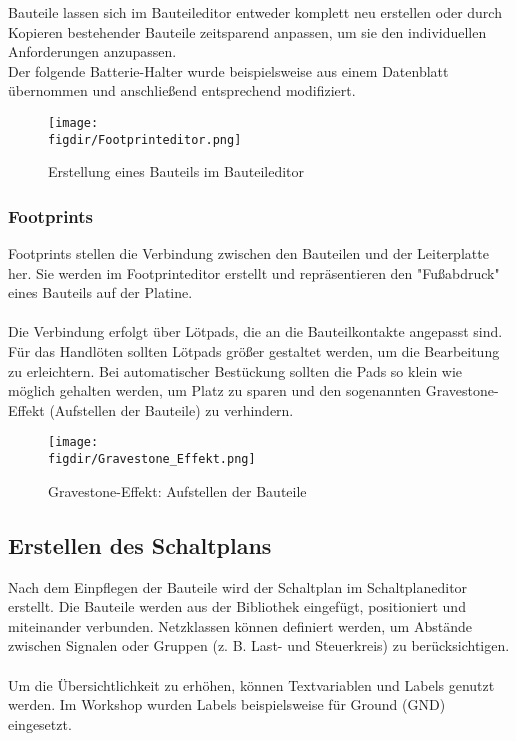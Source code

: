 \noindent
Bauteile lassen sich im Bauteileditor entweder komplett neu erstellen oder durch Kopieren bestehender Bauteile zeitsparend anpassen, um sie den individuellen Anforderungen anzupassen.\\
Der folgende Batterie-Halter wurde beispielsweise aus einem Datenblatt übernommen und anschließend entsprechend modifiziert.

\begin{figure}[h]  
    \centering  
    \texttt{[image: \\figdir/Footprinteditor.png]}  
    \caption{Erstellung eines Bauteils im Bauteileditor} 
    \label{fig:Abbildung 7} 
\end{figure}  

\newpage

\subsubsection{Footprints}  
Footprints stellen die Verbindung zwischen den Bauteilen und der Leiterplatte her. Sie werden im Footprinteditor erstellt und repräsentieren den "Fußabdruck" eines Bauteils auf der Platine.\\
\\
Die Verbindung erfolgt über Lötpads, die an die Bauteilkontakte angepasst sind. Für das Handlöten sollten Lötpads größer gestaltet werden, um die Bearbeitung zu erleichtern.
Bei automatischer Bestückung sollten die Pads so klein wie möglich gehalten werden, um Platz zu sparen und den sogenannten Gravestone-Effekt (Aufstellen der Bauteile) zu verhindern.  

\begin{figure}[h]  
    \centering  
    \texttt{[image: \\figdir/Gravestone\_Effekt.png]}  
    \caption{Gravestone-Effekt: Aufstellen der Bauteile\cite{almit_grabstein_manhattan}}
    \label{fig:Abbildung 8}  
\end{figure}  
\newpage

\subsection{Erstellen des Schaltplans}  
Nach dem Einpflegen der Bauteile wird der Schaltplan im Schaltplaneditor erstellt. Die Bauteile werden aus der Bibliothek eingefügt, positioniert und miteinander verbunden. Netzklassen können definiert werden, um Abstände zwischen Signalen oder Gruppen (z. B. Last- und Steuerkreis) zu berücksichtigen.\\  
\\
Um die Übersichtlichkeit zu erhöhen, können Textvariablen und Labels genutzt werden. Im Workshop wurden Labels beispielsweise für Ground (GND) eingesetzt.  

